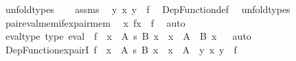 \begin{isabellebody}
\ unfold{\isacharunderscore}{\kern0pt}types\isanewline
\ \ \isamarkupfalse%
\ assms\ \isamarkupfalse%
\ {\isachardoublequoteopen}{\isasymexists}{\isacharbang}{\kern0pt}y{\isachardot}{\kern0pt}\ {\isasymlangle}x{\isacharcomma}{\kern0pt}\ y{\isasymrangle}\ {\isasymin}\ f{\isachardoublequoteclose}\ \isamarkupfalse%
\ Dep{\isacharunderscore}{\kern0pt}Function{\isacharunderscore}{\kern0pt}def\ \isamarkupfalse%
\ unfold{\isacharunderscore}{\kern0pt}types\isanewline
\ \ \isamarkupfalse%
\ pair{\isacharunderscore}{\kern0pt}eval{\isacharunderscore}{\kern0pt}mem{\isacharunderscore}{\kern0pt}if{\isacharunderscore}{\kern0pt}ex{}{\isacharunderscore}{\kern0pt}pair{\isacharunderscore}{\kern0pt}mem\ \isamarkupfalse%
\ {\isachardoublequoteopen}{\isasymlangle}x{\isacharcomma}{\kern0pt}\ f{\isacharbackquote}{\kern0pt}x{\isasymrangle}\ {\isasymin}\ f{\isachardoublequoteclose}\ \isamarkupfalse%
\ auto\isanewline
{}\isamarkupfalse%
%
\endisatagproof
{\isafoldproof}%
%
\isadelimproof
\isanewline
%
\endisadelimproof
\isanewline
{}\isamarkupfalse%
\ eval{\isacharunderscore}{\kern0pt}type\ {\isacharbrackleft}{\kern0pt}type{\isacharbrackright}{\kern0pt}{\isacharcolon}{\kern0pt}\ {\isachardoublequoteopen}eval\ {\isacharcolon}{\kern0pt}\ {\isacharparenleft}{\kern0pt}f\ {\isacharcolon}{\kern0pt}\ {\isacharparenleft}{\kern0pt}x\ {\isacharcolon}{\kern0pt}\ A{\isacharparenright}{\kern0pt}\ {\isasymrightarrow}s\ B\ x{\isacharparenright}{\kern0pt}\ {\isasymRightarrow}\ {\isacharparenleft}{\kern0pt}x\ {\isacharcolon}{\kern0pt}\ A{\isacharparenright}{\kern0pt}\ {\isasymRightarrow}\ B\ x{\isachardoublequoteclose}%
\isadelimproof
\ %
\endisadelimproof
%
\isatagproof
{}\isamarkupfalse%
\ auto%
\endisatagproof
{\isafoldproof}%
%
\isadelimproof
%
\endisadelimproof
\isanewline
\isanewline
{}\isamarkupfalse%
\ Dep{\isacharunderscore}{\kern0pt}Function{\isacharunderscore}{\kern0pt}ex{}{\isacharunderscore}{\kern0pt}pairI{\isacharcolon}{\kern0pt}\ {\isachardoublequoteopen}f\ {\isacharcolon}{\kern0pt}\ {\isacharparenleft}{\kern0pt}{\isacharparenleft}{\kern0pt}x\ {\isacharcolon}{\kern0pt}\ A{\isacharparenright}{\kern0pt}\ {\isasymrightarrow}s\ B\ x{\isacharparenright}{\kern0pt}\ {\isasymLongrightarrow}\ x\ {\isacharcolon}{\kern0pt}\ A\ {\isasymLongrightarrow}\ {\isasymexists}{\isacharbang}{\kern0pt}y{\isachardot}{\kern0pt}\ {\isasymlangle}x{\isacharcomma}{\kern0pt}\ y{\isasymrangle}\ {\isasymin}\ f{\isachardoublequoteclose}\isanewline

\end{isabellebody}
